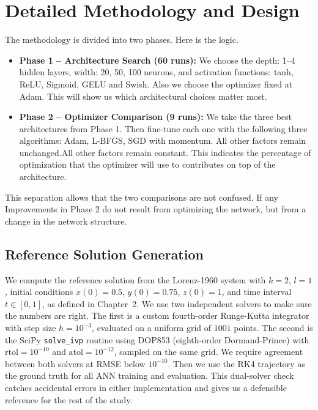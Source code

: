 \section{Detailed Methodology and Design}

The methodology is divided into two phases. Here is the logic.

\begin{itemize}
    \item \textbf{Phase 1 -- Architecture Search (60 runs):} We choose the depth: 1--4 hidden layers, width: 20, 50, 100 neurons, and activation functions: tanh, ReLU, Sigmoid, GELU and Swish. Also we choose the optimizer fixed at Adam. This will show us which architectural choices matter most.
    \item \textbf{Phase 2 -- Optimizer Comparison (9 runs):} We take the three best architectures from Phase 1. Then fine-tune each one with the following three algorithms: Adam, L-BFGS, SGD with momentum. All other factors remain unchanged.All other factors remain constant. This indicates the percentage of optimization that the optimizer will use to
contributes on top of the architecture.

\end{itemize}

This separation allows that the two comparisons are not confused. If any
Improvements in Phase 2 do not result from optimizing the network, but from a change in the network structure.


\subsection{Reference Solution Generation}

We compute the reference solution from the Lorenz-1960 system with $k=2$, $l=1$, initial conditions $x(0)=0.5$, $y(0)=0.75$, $z(0)=1$, and time interval $t \in [0, 1]$, as defined in Chapter~2. We use two independent solvers to make sure the numbers are right. The first is a custom fourth-order Runge-Kutta integrator with step size $h=10^{-3}$, evaluated on a uniform grid of $1001$ points. The second is the SciPy \texttt{solve\_ivp} routine using DOP853 (eighth-order Dormand-Prince) with $\text{rtol}=10^{-10}$ and $\text{atol}=10^{-12}$, sampled on the same grid. We require agreement between both solvers at RMSE below $10^{-10}$. Then we use the RK4 trajectory as the ground truth for all ANN training and evaluation. This dual-solver check catches accidental errors in either implementation and gives us a defensible reference for the rest of the study.

